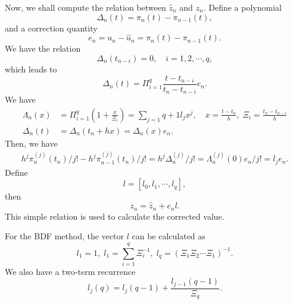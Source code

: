 \documentclass[11pt,a4paper]{article}
\begin{document}
Now, we shall compute the relation between $\hat{z}_n$ and $z_n$. Define a
polynomial
\begin{equation}
  \Delta_n(t) = \pi_n(t) - \pi_{n-1}(t),
\end{equation}
and a correction quantity
\begin{equation}
  e_n = u_n - \hat{u}_n = \pi_n(t) - \pi_{n-1}(t).
\end{equation}
We have the relation
\begin{equation}
  \Delta_n(t_{n-i}) = 0, \quad i=1,2,\cdots,q,
\end{equation}
which leads to
\begin{equation}
  \Delta_n(t) = \Pi_{i=1}^q \frac{t-t_{n-i}}{t_n-t_{n-i}}e_n.
\end{equation}
We have
\begin{align}
  \Lambda_n(x) &= \Pi_{i=1}^q (1+\frac{x}{\Xi_i}) = \sum_{j=1}{q+1}l_jx^j, \quad x=\frac{t-t_n}{h},\;
  \Xi_i = \frac{t_n-t_{n-i}}{h} \\
  \Delta_n(t) &= \Delta_n(t_n+hx) = \Delta_n(x)e_n.
\end{align}
Then, we have
\begin{align}
  h^j\pi_n^{(j)}(t_n)/j! - h^j\pi_{n-1}^{(j)}(t_n)/j! = h^j\Delta_n^{(j)}/j! =
  \Lambda_n^{(j)}(0)e_n/j! = l_je_n.
\end{align}
Define
\begin{equation}
  l = [l_0, l_1, \cdots, l_q],
\end{equation}
then
\begin{equation}
  z_n = \hat{z}_n + e_n l.
\end{equation}
This simple relation is used to calculate the corrected value.

For the BDF method, the vector $l$ can be calculated as
\begin{equation}
  l_1 = 1,\; l_1 = \sum_{i=1}^q \Xi_i^{-1},\; l_q =
  (\Xi_1\Xi_2\cdots\Xi_1)^{-1}.
\end{equation}
We also have a two-term recurrence
\begin{equation}
  l_j(q) = l_j(q-1) + \frac{l_{j-1}(q-1)}{\Xi_q}.
\end{equation}
\end{document}
